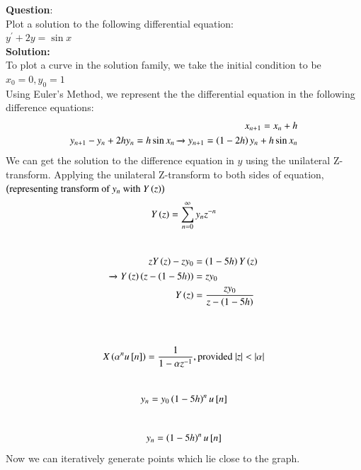 \documentclass[journal]{IEEEtran}
\begin{document}
\textbf{Question}:\\
Plot a solution to the following differential equation:\\
    $y^\prime + 2y = \sin x$
\\
\textbf{Solution: }\\
To plot a curve in the solution family, we take the initial condition to be\\
$x_0 = 0, y_0 = 1$\\
Using Euler's Method, we represent the the differential equation in the following difference equations:
\begin{align}
    x_{n+1} = x_n + h\\
    y_{n+1} - y_n + 2hy_n  = h\sin x_n \xrightarrow{} y_{n+1} = \left(1-2h\right)y_n + h\sin x_n
\end{align}
We can get the solution to the difference equation in $y$ using the unilateral Z-transform.
Applying the unilateral Z-transform to both sides of equation,$\left(\text{representing transform of $y_n$ with $Y\left(z\right)$}\right)$ 
\begin{align}
    Y\left(z\right) = \sum_{n=0}^{\infty}y_nz^{-n}\\
\end{align}
    \\
\begin{align}
    zY\left(z\right) - zy_0 &= \left(1-5h\right)Y\left(z\right)\\
    \xrightarrow{} Y\left(z\right)\left(z - \left(1-5h\right)\right) &= zy_0\\
    Y\left(z\right) &= \frac{zy_0}{z-\left(1-5h\right)}
\end{align}
    \\
    \\
\begin{align}
    X\left(\alpha^nu{}\left[n\right]\right) = \frac{1}{1-\alpha z^{-1}}, \text{provided $|z| < |\alpha|$}
\end{align}
    \\
\begin{align}
    y_n = y_0\left(1-5h\right)^nu{}\left[n\right]
\end{align}
    \\
\begin{align}
    y_n = \left(1-5h\right)^nu{}\left[n\right]
\end{align}
Now we can iteratively generate points which lie close to the graph.\\
\end{document}

